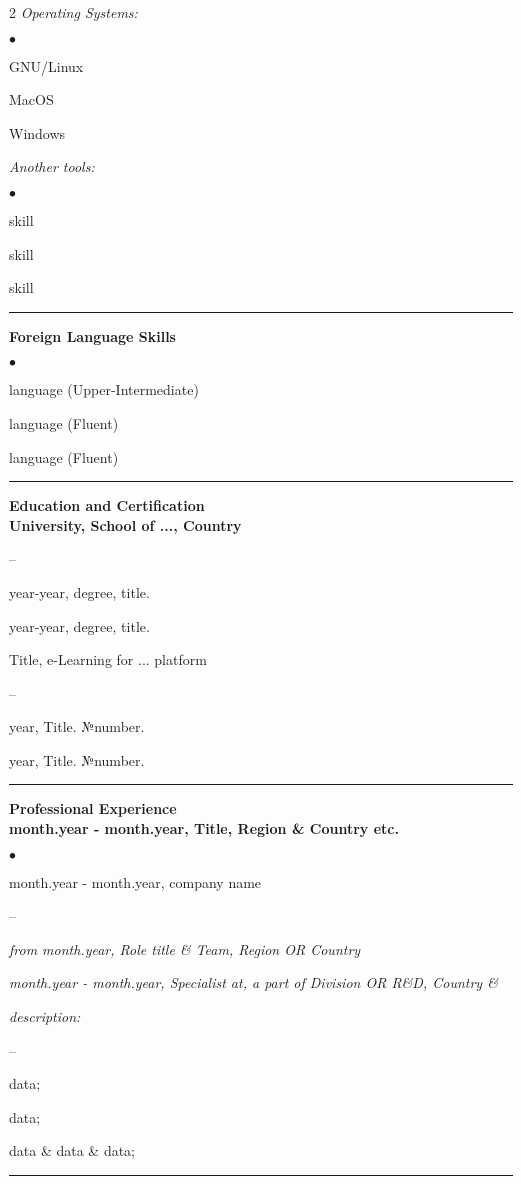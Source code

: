 \documentclass[oneside,final,12pt]{extreport}
\newenvironment{compactlist}{
	\begin{list}{{$\bullet$}}{
		\setlength\leftmargin{0.4cm}
		\setlength\partopsep{0pt}
		\setlength\parskip{0pt}
		\setlength\parsep{0pt}
		\setlength\topsep{0pt}
		\setlength\itemsep{0pt}
	}
}{
	\end{list}
}
\newenvironment{innerlist}{
	\begin{list}{--}{
		\setlength\leftmargin{0.8cm}
		\setlength\partopsep{0pt}
		\setlength\parskip{0pt}
		\setlength\parsep{0pt}
		\setlength\topsep{0pt}
		\setlength\itemsep{0pt}
	}
}{
	\end{list}
}
\begin{document}
\begin{multicols}{2}
\textsl{Operating Systems:}
	\begin{compactlist}
		\item GNU/Linux
		\item MacOS
		\item Windows
	\end{compactlist}
\textsl{Another tools:}
	\begin{compactlist}
		\item skill
		\item skill
		\item skill
	\end{compactlist}
\end{multicols}
\rule{\textwidth}{0.4pt}

\bfseries
Foreign Language Skills
\mdseries
\begin{compactlist}
	\item language (Upper-Intermediate)
	\item language (Fluent)
	\item language (Fluent) 
\end{compactlist}
\rule{\textwidth}{0.4pt}

\bfseries
Education and Certification
\mdseries \\[3pt]	
University, School of ..., Country  	
	 \begin{innerlist}	
	 \item year-year, degree, title. 
	 \item year-year, degree, title. 
	 \end{innerlist}	
Title, e-Learning for ... platform 
	 \begin{innerlist}	
	 \item year, Title. №number.
	 \item year, Title. №number.
	 \end{innerlist}	 
\rule{\textwidth}{0.4pt}

\bfseries
Professional Experience
\mdseries \\[1pt] 
month.year - month.year, Title, Region \& Country etc. 
     \begin{compactlist}
	 \item month.year - month.year, company name
	     \begin{innerlist} 
	     \item \textsl{from month.year, Role title \& Team, Region OR Country} 
	     \item \textsl{month.year - month.year, Specialist at, a part of Division OR R\&D, Country \& } 
        \end{innerlist} 
     \end{compactlist}

         \textsl{description:}
         \begin{innerlist}
	     \item data;
	     \item data; 
	     \item data \& data \& data;
         \end{innerlist}
\rule{\textwidth}{0.4pt}
\end{document}
